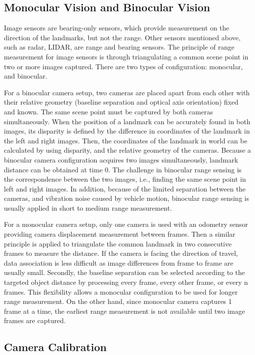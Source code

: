 \subsection{Monocular Vision and Binocular Vision}
Image sensors are bearing-only sensors, which provide measurement on
the direction of the landmarks, but not the range. Other sensors
mentioned above, such as radar, LIDAR, are range and bearing sensors.
The principle of range measurement for image sensors is through
triangulating a common scene point in two or more images captured.
There are two types of configuration: monocular, and binocular.

For a binocular camera setup, two cameras are placed apart from each
other with their relative geometry (baseline separation and optical
axis orientation) fixed and known. The same scene point must be
captured by both cameras simultaneously. When the position of a
landmark can be accurately found in both images, its disparity is
defined by the difference in coordinates of the landmark in the left and
right images. Then, the coordinates of the landmark in world can be
calculated by using disparity, and the relative geometry of the
cameras. Because a binocular camera configuration acquires two images
simultaneously, landmark distance can be obtained at time $0$. The
challenge in binocular range sensing is the correspondence between the
two images, i.e., finding the same scene point in left and right
images. In addition, because of the limited separation between the
cameras, and vibration noise caused by vehicle motion, binocular range
sensing is usually applied in short to medium range measurement.

For a monocular camera setup, only one camera is used with an odometry
sensor providing camera displacement measurement between frames. Then
a similar principle is applied to triangulate the common landmark in two
consecutive frames to measure the distance. If the camera is facing the
direction of travel, data association is less difficult as image
differences from frame to frame are usually small. Secondly, the
baseline separation can be selected according to the targeted object
distance by processing every frame, every other frame, or every n
frames. This flexibility allows a monocular configuration to be
used for longer range measurement. On the other hand, since monocular
camera captures 1 frame at a time, the earliest range measurement is
not available until two image frames are captured.

\subsection{Camera Calibration}

